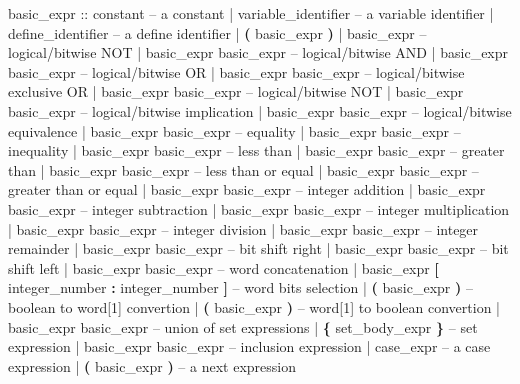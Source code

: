 \begin{Grammar}
basic_expr ::
       constant                  \footnotesize{-- a constant}
      | variable_identifier          \footnotesize{-- a variable identifier}
      | define_identifier            \footnotesize{-- a define identifier}
      | \textbf{(} basic_expr \textbf{)}
      | \operator{!} basic_expr              \footnotesize{-- logical/bitwise NOT}
      | basic_expr \operator{\&} basic_expr    \footnotesize{-- logical/bitwise AND}
      | basic_expr \operator{|} basic_expr    \footnotesize{-- logical/bitwise OR}
      | basic_expr  basic_expr  \footnotesize{-- logical/bitwise exclusive OR}
      | basic_expr  basic_expr \footnotesize{-- logical/bitwise NOT }
      | basic_expr \operator{->} basic_expr   \footnotesize{-- logical/bitwise implication}
      | basic_expr \operator{<->} basic_expr  \footnotesize{-- logical/bitwise equivalence}
      | basic_expr \operator{=} basic_expr    \footnotesize{-- equality}
      | basic_expr \operator{!=} basic_expr   \footnotesize{-- inequality}
      | basic_expr \operator{<} basic_expr    \footnotesize{-- less than}
      | basic_expr \operator{>} basic_expr    \footnotesize{-- greater than}
      | basic_expr \operator{<=} basic_expr   \footnotesize{-- less than or equal}
      | basic_expr \operator{>=} basic_expr   \footnotesize{-- greater than or equal}
      | basic_expr \operator{+} basic_expr    \footnotesize{-- integer addition}
      | basic_expr \operator{-} basic_expr    \footnotesize{-- integer subtraction}
      | basic_expr \operator{*} basic_expr    \footnotesize{-- integer multiplication}
      | basic_expr \operator{/} basic_expr    \footnotesize{-- integer division}
      | basic_expr  basic_expr  \footnotesize{-- integer remainder}
      | basic_expr \operator{>>} basic_expr   \footnotesize{-- bit shift right}
      | basic_expr \operator{<<} basic_expr   \footnotesize{-- bit shift left}
      | basic_expr \operator{::} basic_expr   \footnotesize{-- word concatenation}
      | basic_expr \textbf{[} integer_number \textbf{:} integer_number \textbf{]}
                                     \footnotesize{-- word bits selection}
      |  \textbf{(} basic_expr \textbf{)} \footnotesize{-- boolean to word[1] convertion}
      |  \textbf{(} basic_expr \textbf{)}  \footnotesize{-- word[1] to boolean convertion}
      | basic_expr  basic_expr \footnotesize{-- union of set expressions }
      | \textbf{\{} set_body_expr \textbf{\}}             \footnotesize{-- set expression}
      | basic_expr  basic_expr    \footnotesize{-- inclusion expression}
      | case_expr                     \footnotesize{-- a case expression}
      |  \textbf{(} basic_expr \textbf{)}        \footnotesize{-- a next expression}
\end{Grammar}
 

